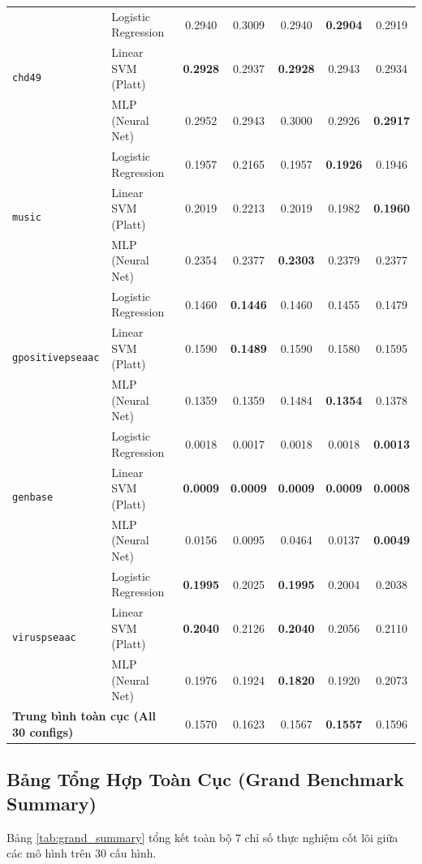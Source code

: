 \documentclass[10pt,a4paper,twoside]{article}
\begin{document}
\begin{table}[H]
{\begin{tabular}{llccccc}
\multirow{3}{*}{\texttt{chd49}} & Logistic Regression & 0.2940 & 0.3009 & 0.2940 & \textbf{0.2904} & 0.2919 \\
 & Linear SVM (Platt) & \textbf{0.2928} & 0.2937 & \textbf{0.2928} & 0.2943 & 0.2934 \\
 & MLP (Neural Net) & 0.2952 & 0.2943 & 0.3000 & 0.2926 & \textbf{0.2917} \\
\midrule
\multirow{3}{*}{\texttt{music}} & Logistic Regression & 0.1957 & 0.2165 & 0.1957 & \textbf{0.1926} & 0.1946 \\
 & Linear SVM (Platt) & 0.2019 & 0.2213 & 0.2019 & 0.1982 & \textbf{0.1960} \\
 & MLP (Neural Net) & 0.2354 & 0.2377 & \textbf{0.2303} & 0.2379 & 0.2377 \\
\midrule
\multirow{3}{*}{\texttt{gpositivepseaac}} & Logistic Regression & 0.1460 & \textbf{0.1446} & 0.1460 & 0.1455 & 0.1479 \\
 & Linear SVM (Platt) & 0.1590 & \textbf{0.1489} & 0.1590 & 0.1580 & 0.1595 \\
 & MLP (Neural Net) & 0.1359 & 0.1359 & 0.1484 & \textbf{0.1354} & 0.1378 \\
\midrule
\multirow{3}{*}{\texttt{genbase}} & Logistic Regression & 0.0018 & 0.0017 & 0.0018 & 0.0018 & \textbf{0.0013} \\
 & Linear SVM (Platt) & \textbf{0.0009} & \textbf{0.0009} & \textbf{0.0009} & \textbf{0.0009} & \textbf{0.0008} \\
 & MLP (Neural Net) & 0.0156 & 0.0095 & 0.0464 & 0.0137 & \textbf{0.0049} \\
\midrule
\multirow{3}{*}{\texttt{viruspseaac}} & Logistic Regression & \textbf{0.1995} & 0.2025 & \textbf{0.1995} & 0.2004 & 0.2038 \\
 & Linear SVM (Platt) & \textbf{0.2040} & 0.2126 & \textbf{0.2040} & 0.2056 & 0.2110 \\
 & MLP (Neural Net) & 0.1976 & 0.1924 & \textbf{0.1820} & 0.1920 & 0.2073 \\
\midrule
\multicolumn{2}{l}{\textbf{Trung bình toàn cục (All 30 configs)}} & 0.1570 & 0.1623 & 0.1567 & \textbf{0.1557} & 0.1596 \\
\bottomrule
\end{tabular}%
}
\end{table}
\clearpage
\subsection{Bảng Tổng Hợp Toàn Cục (Grand Benchmark Summary)}
Bảng \ref{tab:grand_summary} tổng kết toàn bộ 7 chỉ số thực nghiệm cốt lõi giữa các mô hình trên 30 cấu hình.
\end{document}
